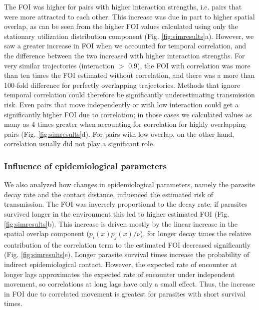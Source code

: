 \documentclass[letterpaper]{article}
\begin{document}
The FOI was higher for pairs with higher interaction strengths, i.e. pairs that were more attracted to each other. This increase was due in part to higher spatial overlap, as can be seen from the higher FOI values calculated using only the stationary utilization distribution component (Fig. \ref{fig:simresults}a). However, we saw a greater increase in FOI when we accounted for temporal correlation, and the difference between the two increased with higher interaction strengths. For very similar trajectories (interaction $>$ 0.9), the FOI with correlation was more than ten times the FOI estimated without correlation, and there was a more than 100-fold difference for perfectly overlapping trajectories.
Methods that ignore temporal correlation could therefore be significantly underestimating transmission risk. Even pairs that move independently or with low interaction could get a significantly higher FOI due to correlation; in those cases we calculated values as many as 4 times greater when accounting for correlation for highly overlapping pairs (Fig. \ref{fig:simresults}d). %
For pairs with low overlap, on the other hand, correlation usually did not play a significant role. 

\subsubsection*{Influence of epidemiological parameters}

We also analyzed how changes in epidemiological parameters, namely the parasite decay rate and the contact distance, influenced the estimated risk of transmission. 
The FOI was inversely proportional to the decay rate; if parasites survived longer in the environment this led to higher estimated FOI (Fig. \ref{fig:simresults}b). This increase is driven mostly by the linear increase in the spatial overlap component ($p_i(x)p_j(x)/\nu$), for longer decay times the relative contribution of the correlation term to the estimated FOI decreased significantly (Fig. \ref{fig:simresults}e). Longer parasite survival times increase the probability of indirect epidemiological contact. However, the expected rate of encounter at longer lags approximates the expected rate of encounter under independent movement, so correlations at long lags have only a small effect. Thus, the increase in FOI due to correlated movement is greatest for parasites with short survival times. 
\end{document}
